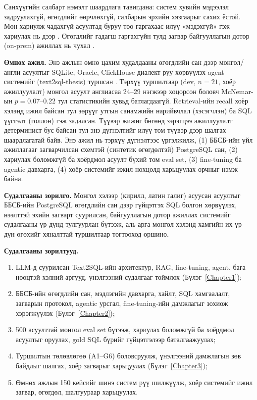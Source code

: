Санхүүгийн салбарт нэмэлт шаардлага тавигдана: систем хувийн мэдээлэл задруулахгүй, өгөгдлийг өөрчлөхгүй, салбарын
эрхийн хязгаарыг сахих ёстой. Мөн хариулж чадахгүй асуултад буруу тоо гаргахаас илүү «мэдэхгүй» гэж хариулах нь
дээр \cite{lee_2024_trustsql}. Өгөгдлийг гадагш гаргахгүйн тулд загвар байгууллагын дотор (on-prem) ажиллах нь
чухал \cite{beskorovainyi_2026_onprem_frontier}.

\textbf{Өмнөх ажил.} Энэ ажлын өмнө цахим худалдааны өгөгдлийн сан дээр монгол/англи асуултыг SQLite, Oracle,
ClickHouse диалект руу хөрвүүлэх agent системийг (text2sql-thesis) туршсан \cite{text2sql_thesis_2026}. Тэрхүү
туршилтаар (dev, $n = 21$, хоёр ажиллуулалт) монгол асуулт англиасаа 24--29 нэгжээр хоцорсон боловч McNemar-ын
$p = 0.07$--$0.22$ тул статистикийн хувьд батлагдаагүй. Retrieval-ийн recall хоёр хэлэнд ижил байсан тул зөрүүг утгын
санамжийн нарийвчлал (хэсэгчлэн) ба SQL үүсгэлт (голлон) гэж задалсан. Түүвэр жижиг бөгөөд зэрэгцээ ажиллуулалт
детерминист бус байсан тул энэ дүгнэлтийг илүү том түүвэр дээр шалгах шаардлагатай байв. Энэ ажил нь тэрхүү
дүгнэлтээс үргэлжилж, (1) ББСБ-ийн үйл ажиллагааг загварчилсан схемтэй (синтетик өгөгдөлтэй) PostgreSQL сан,
(2) хариулах боломжгүй ба хоёрдмол асуулт бүхий том eval set, (3) fine-tuning ба agentic давхарга, (4) хоёр системийг
ижил нөхцөлд харьцуулах орчныг нэмж байна.

\textbf{Судалгааны зорилго.} Монгол хэлээр (кирилл, латин галиг) асуусан асуултыг ББСБ-ийн PostgreSQL өгөгдлийн сан
дээр гүйцэтгэх SQL болгон хөрвүүлэх, нээлттэй эхийн загварт суурилсан, байгууллагын дотор ажиллах системийг
судалгааны үр дүнд тулгуурлан бүтээж, аль арга монгол хэлэнд хамгийн их үр дүн өгөхийг хяналттай туршилтаар
тогтооход оршино.

\textbf{Судалгааны зорилтууд.}
\begin{enumerate}
  \item LLM-д суурилсан Text2SQL-ийн архитектур, RAG, fine-tuning, agent, бага нөөцтэй хэлний аргууд, үнэлгээний
        судалгааг тоймлох (Бүлэг~\ref{Chapter1});
  \item ББСБ-ийн өгөгдлийн сан, мэдлэгийн давхарга, хайлт, SQL хамгаалалт, загварын протокол, agentic урсгал,
        fine-tuning-ийн дамжлагыг зохиож хэрэгжүүлэх (Бүлэг~\ref{Chapter2});
  \item 500 асуулттай монгол eval set бүтээж, хариулах боломжгүй ба хоёрдмол асуултыг оруулах, gold SQL бүрийг
        гүйцэтгэлээр баталгаажуулах;
  \item Туршилтын төлөвлөгөө (A1--G6) боловсруулж, үнэлгээний дамжлагын зөв байдлыг шалгах, хоёр загварыг
        харьцуулах (Бүлэг~\ref{Chapter3});
  \item Өмнөх ажлын 150 кейсийг шинэ систем рүү шилжүүлж, хоёр системийг ижил загвар, өгөгдөл, шалгуураар
        харьцуулах.
\end{enumerate}

